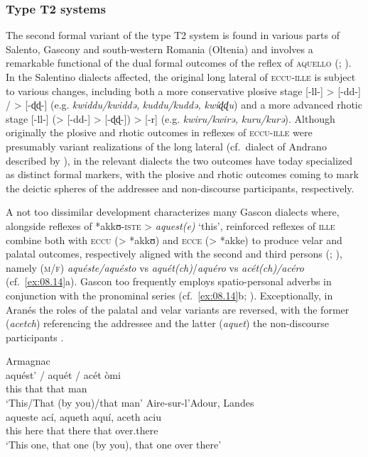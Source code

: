 \documentclass[output=paper]{langsci/langscibook}
\begin{document}
\subsubsection{\label{bkm:Ref370497195}Type T2 systems}

The second formal variant of the type T2 system is found in various parts of
Salento, Gascony and south-western Romania (Oltenia) and involves a remarkable
functional  of the dual formal outcomes of the reflex of
\textsc{aquello} (\citealt[159f]{Mancarella:1998a};
\citealt[§2.2.1.1]{Sornicola:2011a}). In the Salentino
dialects affected, the original long lateral of \textsc{eccu-ille} is subject
to various changes, including both a more conservative plosive stage [-ll-] >
[\nobreakdash-dd\nobreakdash-] / > [-ɖɖ{}-] (e.g. \emph{kwiddu/kwiddə,}
\emph{kuddu/kuddə,} \emph{kwíɖɖu}) and a more advanced rhotic stage [-ll-] (>
[-dd-] > [\nobreakdash-ɖɖ-]) > [-r] (e.g. \emph{kwiru/kwirə,}
\emph{kuru/kurə}). Although originally the plosive and rhotic outcomes in
reflexes of \textsc{eccu-ille} were presumably variant realizations of the long
lateral (cf.\ dialect of Andrano described by \citealt[157]{Mancarella:1998a}),
in the relevant dialects the two outcomes have today specialized as distinct
formal markers, with the plosive and rhotic outcomes coming to mark the deictic
spheres of the addressee and non-discourse participants, respectively.

A not too dissimilar development characterizes many Gascon dialects where,
alongside reflexes of *akkʊ-\textsc{iste} > \emph{aquest(e)} ‘this’, reinforced
reflexes of \textsc{ille} combine both with \textsc{eccu} (> *akkʊ) and
\textsc{ecce} (> *akke) to produce velar and palatal outcomes, respectively
aligned with the second and third persons (\citealt[188]{Rohlfs:1970ab};
\citealt[§2.2.1.1]{Sornicola:2011a}), namely
(\textsc{m}/\textsc{f}) \emph{aquéste/aquésto} vs
\emph{aquét(ch)}/\emph{aquéro} vs \emph{acét(ch)/acéro} (cf.\ \ref{ex:08.14}a). Gascon
too frequently employs spatio-personal adverbs in conjunction with the
pronominal series (cf.\ \ref{ex:08.14}b; \citealt[34]{Dauge:2000a}). Exceptionally, in
Aranés the roles of the palatal and velar variants are reversed, with the
former (\emph{acetch}) referencing the addressee and the latter (\emph{aquet})
the non-discourse participants \citep[188, n.\ 323]{Rohlfs:1970ab}.

\ea\label{bkm:Ref370499020}\label{ex:08.14}
    \ea  Armagnac \citep{Rohlfs:1970ab}\\
    \gll      aquést’ /  aquét /  acét  òmi\\
            this  {} that {} that  man\\
        \glt \enquote*{This/That (by you)/that man}
    \ex Aire-sur-l’Adour, Landes \citep{Dauge:2000a}\\
    \gll      aqueste  ací,  aqueth  aquí,  aceth  aciu\\
                 this  here  that  there  that  over.there\\
        \glt \enquote*{This one, that one (by you), that one over there}
    \z
\z
\end{document}
